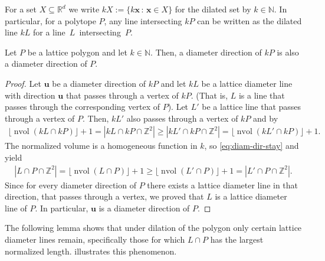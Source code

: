 \documentclass[11pt]{article}
\newcommand{\bu}{\mathbf{u}}
\newcommand{\bx}{\mathbf{x}}
\newcommand{\R}{\mathbb{R}}
\newcommand{\Z}{\mathbb{Z}}
\newcommand{\N}{\mathbb{N}}
\DeclareMathOperator{\nvol}{nvol}
\newcommand{\st}{\, \mathrm{:}\,}
\begin{document}
For a set $X \subseteq \R^d$ we write $kX:= \{k \bx \st \bx \in X\}$ for the dilated set by $k \in \N$. In particular, for a polytope $P$, any line intersecting $kP$ can be written as the dilated line $kL$ for a \mbox{line $L$ intersecting $P$.}

\begin{lemma}\label{lemma:same-dir}
    Let $P$ be a lattice polygon and let $k \in \N$. Then, a diameter direction of $kP$ is also a diameter direction of $P$.
\end{lemma}
\begin{proof}
    Let $\bu$ be a diameter direction of $kP$ and let $kL$ be a lattice diameter line with direction $\bu$ that passes through a vertex of $kP$. (That is, $L$ is a line that passes through the corresponding vertex of $P$). Let $L'$ be a lattice line that passes through a vertex of $P$. Then, $kL'$ also passes through a vertex of $kP$ and by 
    \begin{align}\label{eq:diam-dir-stay}
        \lfloor \nvol(kL \cap kP) \rfloor +1 = |kL \cap kP \cap \Z^2|  \geq |kL' \cap kP \cap \Z^2| = \lfloor \nvol(kL' \cap kP) \rfloor +1.
    \end{align}
    The normalized volume is a homogeneous function in $k$, so \eqref{eq:diam-dir-stay} and  yield
    \begin{align*}
        |L \cap P \cap \Z^2|  = \lfloor \nvol(L \cap P) \rfloor +1 \geq \lfloor \nvol(L' \cap P) \rfloor +1 =|L' \cap P \cap \Z^2|.
    \end{align*}
    Since for every diameter direction of $P$ there exists a lattice diameter line in that direction, that passes through a vertex, we proved that $L$ is a lattice diameter line of $P$. In particular, $\bu$ is a diameter direction of $P$.
\end{proof}

The following lemma shows that under dilation of the polygon only certain lattice diameter lines remain, specifically those for which $L \cap P$ has the largest normalized length.  illustrates this phenomenon.

\end{document}
